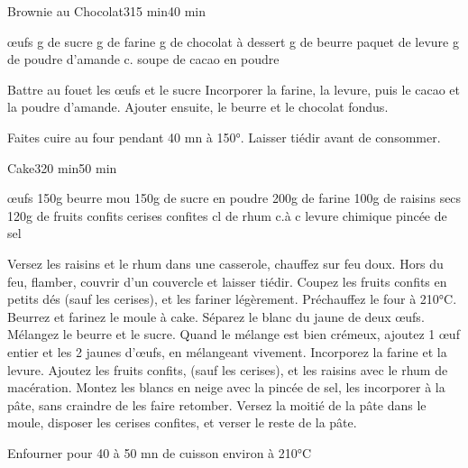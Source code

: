 \begin{recette}{Brownie au Chocolat}{3}{15 min}{40 min}
\begin{ingredients}
 œufs
 g de sucre
 g de farine
 g de chocolat à dessert
 g de beurre
 paquet de levure
 g de poudre d'amande
 c. soupe de cacao en poudre
\end{ingredients}

\begin{preparation}
\etape Battre au fouet les œufs et le sucre
\etape Incorporer la farine, la levure, puis le cacao et la poudre d'amande.
\etape Ajouter ensuite, le beurre et le chocolat fondus.
\end{preparation}

\begin{cuisson}
Faites cuire au four pendant 40 mn à 150°.
Laisser tiédir avant de consommer. 
\end{cuisson}
\end{recette}

\begin{recette}{Cake}{3}{20 min}{50 min}
\begin{ingredients}
 œufs
\ingredient 150g beurre mou
\ingredient 150g de sucre en poudre
\ingredient 200g de farine
\ingredient 100g de raisins secs
\ingredient 120g de fruits confits
\ingredient cerises confites
 cl de rhum
 c.à c levure chimique
 pincée de sel
\end{ingredients}

\begin{preparation}
\etape Versez les raisins et le rhum dans une casserole, chauffez sur feu doux. Hors du feu, flamber, couvrir d'un couvercle et laisser tiédir.
\etape Coupez les fruits confits en petits dés (sauf les cerises), et les fariner légèrement.
\etape Préchauffez le four à 210°C. Beurrez et farinez le moule à cake.
\etape Séparez le blanc du jaune de deux œufs.
\etape Mélangez le beurre et le sucre. Quand le mélange est bien crémeux, ajoutez 1 œuf entier et les 2 jaunes d'œufs, en mélangeant vivement.
\etape Incorporez la farine et la levure.
\etape Ajoutez les fruits confits, (sauf les cerises), et les raisins avec le rhum de macération.
\etape Montez les blancs en neige avec la pincée de sel, les incorporer à la pâte, sans craindre de les faire retomber.
\etape Versez la moitié de la pâte dans le moule, disposer les cerises confites, et verser le reste de la pâte.

\end{preparation}

\begin{cuisson}
Enfourner pour 40 à 50 mn de cuisson environ à 210°C
\end{cuisson}



\end{recette}

